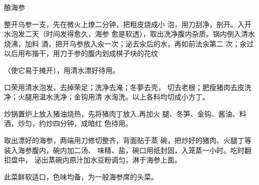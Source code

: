 \begin{recipe}[一品海参]{酿海参}

\ingredients


\cooking

\step 	整开乌参一支，先在微火上燎二分钟，把粗皮烧成小 泡，用刀刮净，剖开。入开水泡发二天（时间发得愈久，海参 愈是软透），取出洗净腹内杂质。锅内倒入清水烧沸，加料 酒，把开乌参放入汆一次；泌去汆后的水，再如前法汆第二 次；汆过以后用布揩干，用刀于参的腹内划成棋子块的花纹

〈使它易于摊开〕，用清水漂好待用。

\step 	口荣用清水泡发，去掉荣足；洗净去淹；冬夢去壳， 切去老根；肥瘦猪肉去皮洗净；火腿用温水洗净；金钩用清 水淘洗。以上各料均切成小方丁。

\step 	炒锅置炉上放入猪油烧热，先将猪肉丁放入,再加火 腿、冬笋、金钩、酱油、料酒，炒匀，约炒四分钟，成暗红 色待用。

取出漂好的海参，两端用刀修切整齐，背面贴于蒸 碗，把炒好的猪肉、火腿丁等装入海参腹内，碗内加二汤、 味精、盐，碗口用纸封固，入笼蒸一小时。吃时翻扣盘中， 泌出蒸碗内原汁加水豆粉调匀，淋于海参上面。

\notes

此菜鲜软适口，色味均备，为一般海参席的头菜。

\end{recipe}

